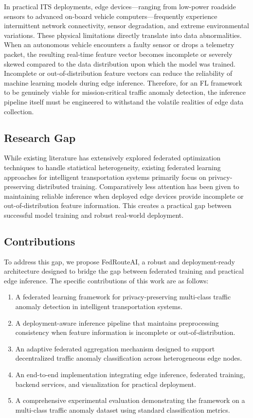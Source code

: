 In practical ITS deployments, edge devices---ranging from low-power roadside sensors to advanced on-board vehicle computers---frequently experience intermittent network connectivity, sensor degradation, and extreme environmental variations. These physical limitations directly translate into data abnormalities. When an autonomous vehicle encounters a faulty sensor or drops a telemetry packet, the resulting real-time feature vector becomes incomplete or severely skewed compared to the data distribution upon which the model was trained. Incomplete or out-of-distribution feature vectors can reduce the reliability of machine learning models during edge inference. Therefore, for an FL framework to be genuinely viable for mission-critical traffic anomaly detection, the inference pipeline itself must be engineered to withstand the volatile realities of edge data collection.

\subsection{Research Gap}

While existing literature has extensively explored federated optimization techniques to handle statistical heterogeneity, existing federated learning approaches for intelligent transportation systems primarily focus on privacy-preserving distributed training. Comparatively less attention has been given to maintaining reliable inference when deployed edge devices provide incomplete or out-of-distribution feature information. This creates a practical gap between successful model training and robust real-world deployment.

\subsection{Contributions}

To address this gap, we propose FedRouteAI, a robust and deployment-ready architecture designed to bridge the gap between federated training and practical edge inference. The specific contributions of this work are as follows:
\begin{enumerate}
    \item A federated learning framework for privacy-preserving multi-class traffic anomaly detection in intelligent transportation systems.
    \item A deployment-aware inference pipeline that maintains preprocessing consistency when feature information is incomplete or out-of-distribution.
    \item An adaptive federated aggregation mechanism designed to support decentralized traffic anomaly classification across heterogeneous edge nodes.
    \item An end-to-end implementation integrating edge inference, federated training, backend services, and visualization for practical deployment.
    \item A comprehensive experimental evaluation demonstrating the framework on a multi-class traffic anomaly dataset using standard classification metrics.
\end{enumerate}
